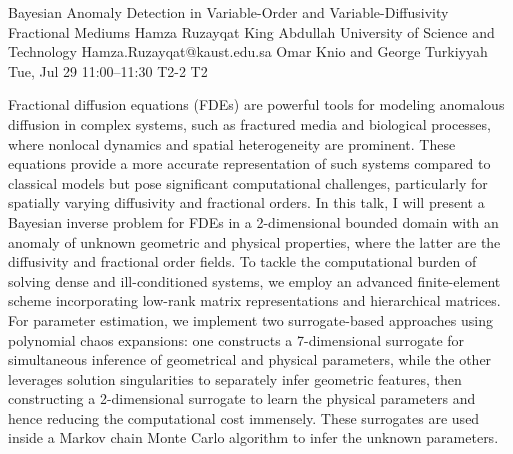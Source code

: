 \documentclass[12pt,lettersize,oneside]{book} %
\begin{document}
\begin{talk}
  {Bayesian Anomaly Detection in Variable-Order and Variable-Diffusivity Fractional Mediums}%
  {Hamza Ruzayqat}%
  {King Abdullah University of Science and Technology}%
  {Hamza.Ruzayqat@kaust.edu.sa}%
  {Omar Knio and George Turkiyyah}%
  {}%
  {Tue, Jul 29 11:00--11:30}%
  {T2-2}%
  {T2}%
  
    
   
Fractional diffusion equations (FDEs) are powerful tools for modeling anomalous diffusion in complex systems, such as fractured media and biological processes, where nonlocal dynamics and spatial heterogeneity are prominent. These equations provide a more accurate representation of such systems compared to classical models but pose significant computational challenges, particularly for spatially varying diffusivity and fractional orders. In this talk, I will present a Bayesian inverse problem for FDEs in a 2-dimensional bounded domain with an anomaly of unknown geometric and physical properties, where the latter are the diffusivity and fractional order fields. To tackle the computational burden of solving dense and ill-conditioned systems, we employ an advanced finite-element scheme incorporating low-rank matrix representations and hierarchical matrices. For parameter estimation, we implement two surrogate-based approaches using polynomial chaos expansions: one constructs a 7-dimensional surrogate for simultaneous inference of geometrical and physical parameters, while the other leverages solution singularities to separately infer geometric features, then constructing a 2-dimensional surrogate to learn the physical parameters and hence reducing the computational cost immensely. These surrogates are used inside a Markov chain Monte Carlo algorithm to infer the unknown parameters.

\medskip

\end{talk}
\end{document}

